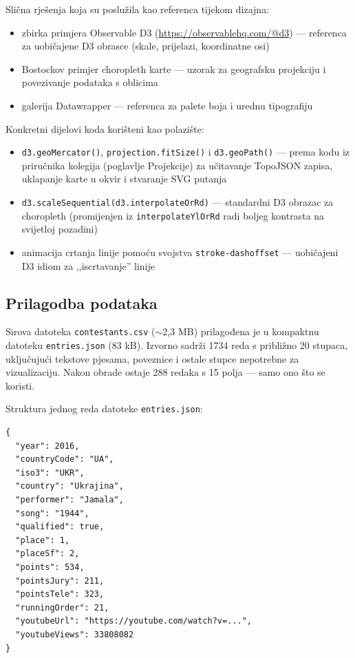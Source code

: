 \documentclass[a4paper,11pt]{article}
\begin{document}
Slična rješenja koja su poslužila kao referenca tijekom dizajna:

\begin{itemize}
  \item zbirka primjera Observable D3 (\url{https://observablehq.com/@d3}) --- referenca za uobičajene D3 obrasce (skale, prijelazi, koordinatne osi)
  \item Bostockov primjer choropleth karte --- uzorak za geografsku projekciju i povezivanje podataka s oblicima
  \item galerija Datawrapper --- referenca za palete boja i urednu tipografiju
\end{itemize}

Konkretni dijelovi koda korišteni kao polazište:

\begin{itemize}
  \item \texttt{d3.geoMercator()}, \texttt{projection.fitSize()} i \texttt{d3.geoPath()} --- prema kodu iz priručnika kolegija (poglavlje Projekcije) za učitavanje TopoJSON zapisa, uklapanje karte u okvir i stvaranje SVG putanja
  \item \texttt{d3.scaleSequential(d3.interpolateOrRd)} --- standardni D3 obrazac za choropleth (promijenjen iz \texttt{interpolateYlOrRd} radi boljeg kontrasta na svijetloj pozadini)
  \item animacija crtanja linije pomoću svojstva \texttt{stroke-dashoffset} --- uobičajeni D3 idiom za ,,iscrtavanje'' linije
\end{itemize}

\subsection{Prilagodba podataka}

Sirova datoteka \texttt{contestants.csv} ($\sim$2,3 MB) prilagođena je u kompaktnu datoteku \texttt{entries.json} (83 kB). Izvorno sadrži 1734 reda s približno 20 stupaca, uključujući tekstove pjesama, poveznice i ostale stupce nepotrebne za vizualizaciju. Nakon obrade ostaje 288 redaka s 15 polja --- samo ono što se koristi.

Struktura jednog reda datoteke \texttt{entries.json}:

\begin{lstlisting}
{
  "year": 2016,
  "countryCode": "UA",
  "iso3": "UKR",
  "country": "Ukrajina",
  "performer": "Jamala",
  "song": "1944",
  "qualified": true,
  "place": 1,
  "placeSf": 2,
  "points": 534,
  "pointsJury": 211,
  "pointsTele": 323,
  "runningOrder": 21,
  "youtubeUrl": "https://youtube.com/watch?v=...",
  "youtubeViews": 33808082
}
\end{lstlisting}
\end{document}
